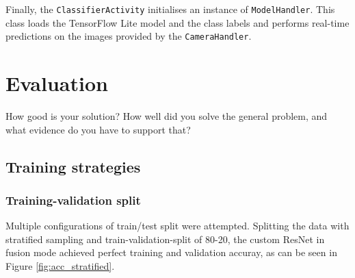\documentclass{l4proj}
\begin{document}
Finally, the \lstinline{ClassifierActivity} initialises an instance of \lstinline{ModelHandler}. This class loads the TensorFlow Lite model and the class labels and performs real-time predictions on the images provided by the \lstinline{CameraHandler}.




\chapter{Evaluation} 
How good is your solution? How well did you solve the general problem, and what evidence do you have to support that?

\section{Training strategies}

\subsection{Training-validation split}
\label{eval_train_val_split}

Multiple configurations of train/test split were attempted. Splitting the data with stratified sampling and train-validation-split of 80-20, the custom ResNet in fusion mode achieved perfect training and validation accuray, as can be seen in Figure \ref{fig:acc_stratified}.  
\end{document}
